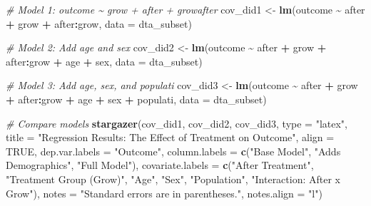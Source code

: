 \documentclass[
]{article}
\newenvironment{Shaded}{\begin{snugshade}}{\end{snugshade}}
\newcommand{\AttributeTok}[1]{\textcolor[rgb]{0.13,0.29,0.53}{#1}}
\newcommand{\CommentTok}[1]{\textcolor[rgb]{0.56,0.35,0.01}{\textit{#1}}}
\newcommand{\ConstantTok}[1]{\textcolor[rgb]{0.56,0.35,0.01}{#1}}
\newcommand{\FunctionTok}[1]{\textcolor[rgb]{0.13,0.29,0.53}{\textbf{#1}}}
\newcommand{\NormalTok}[1]{#1}
\newcommand{\OtherTok}[1]{\textcolor[rgb]{0.56,0.35,0.01}{#1}}
\newcommand{\SpecialCharTok}[1]{\textcolor[rgb]{0.81,0.36,0.00}{\textbf{#1}}}
\newcommand{\StringTok}[1]{\textcolor[rgb]{0.31,0.60,0.02}{#1}}
\begin{document}
\begin{Shaded}
\begin{Highlighting}[]
\CommentTok{\# Model 1: outcome \textasciitilde{} grow + after + growafter}
\NormalTok{cov\_did1 }\OtherTok{\textless{}{-}} \FunctionTok{lm}\NormalTok{(outcome }\SpecialCharTok{\textasciitilde{}}\NormalTok{ after }\SpecialCharTok{+}\NormalTok{ grow }\SpecialCharTok{+}\NormalTok{ after}\SpecialCharTok{:}\NormalTok{grow, }\AttributeTok{data =}\NormalTok{ dta\_subset)}

\CommentTok{\# Model 2: Add age and sex}
\NormalTok{cov\_did2 }\OtherTok{\textless{}{-}} \FunctionTok{lm}\NormalTok{(outcome }\SpecialCharTok{\textasciitilde{}}\NormalTok{ after }\SpecialCharTok{+}\NormalTok{ grow }\SpecialCharTok{+}\NormalTok{ after}\SpecialCharTok{:}\NormalTok{grow }\SpecialCharTok{+}\NormalTok{ age }\SpecialCharTok{+}\NormalTok{ sex, }\AttributeTok{data =}\NormalTok{ dta\_subset)}

\CommentTok{\# Model 3: Add age, sex, and populati}
\NormalTok{cov\_did3 }\OtherTok{\textless{}{-}} \FunctionTok{lm}\NormalTok{(outcome }\SpecialCharTok{\textasciitilde{}}\NormalTok{ after }\SpecialCharTok{+}\NormalTok{ grow }\SpecialCharTok{+}\NormalTok{ after}\SpecialCharTok{:}\NormalTok{grow }\SpecialCharTok{+}\NormalTok{ age }\SpecialCharTok{+}\NormalTok{ sex }\SpecialCharTok{+}\NormalTok{ populati, }\AttributeTok{data =}\NormalTok{ dta\_subset)}
\end{Highlighting}
\end{Shaded}

\begin{Shaded}
\begin{Highlighting}[]
\CommentTok{\# Compare models}
\FunctionTok{stargazer}\NormalTok{(cov\_did1, cov\_did2, cov\_did3,     }
          \AttributeTok{type =} \StringTok{"latex"}\NormalTok{,                 }
          \AttributeTok{title =} \StringTok{"Regression Results: The Effect of Treatment on Outcome"}\NormalTok{,}
          \AttributeTok{align =} \ConstantTok{TRUE}\NormalTok{,                   }
          \AttributeTok{dep.var.labels =} \StringTok{"Outcome"}\NormalTok{,     }
          \AttributeTok{column.labels =} \FunctionTok{c}\NormalTok{(}\StringTok{"Base Model"}\NormalTok{, }\StringTok{"Adds Demographics"}\NormalTok{, }\StringTok{"Full Model"}\NormalTok{),}
          \AttributeTok{covariate.labels =} \FunctionTok{c}\NormalTok{(}\StringTok{"After Treatment"}\NormalTok{, }\StringTok{"Treatment Group (Grow)"}\NormalTok{, }\StringTok{"Age"}\NormalTok{,}
                               \StringTok{"Sex"}\NormalTok{, }\StringTok{"Population"}\NormalTok{, }\StringTok{"Interaction: After x Grow"}\NormalTok{),}
          \AttributeTok{notes =} \StringTok{"Standard errors are in parentheses."}\NormalTok{,}
          \AttributeTok{notes.align =} \StringTok{"l"}\NormalTok{)}
\end{Highlighting}
\end{Shaded}
\end{document}
